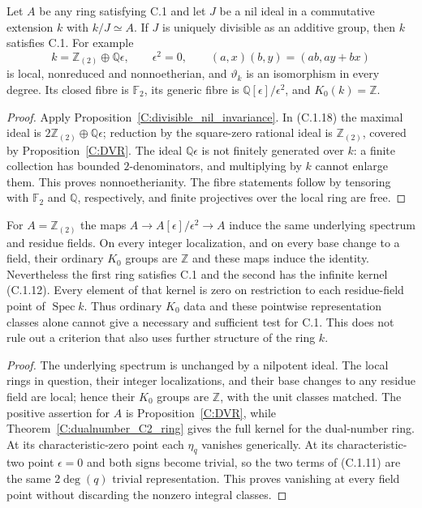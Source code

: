 \begin{corollary}
\label{C:divisible_nil_positive}
Let $A$ be any ring satisfying C.1 and let $J$ be a nil ideal in
a commutative extension $k$ with $k/J\simeq A$. If $J$ is uniquely
divisible as an additive group, then $k$ satisfies C.1.
For example
\[
 k=\mathbb Z_{(2)}\oplus\mathbb Q\epsilon,
 \qquad\epsilon^2=0,\qquad
 (a,x)(b,y)=(ab,ay+bx)                                \tag{C.1.18}
\]
is local, nonreduced and nonnoetherian, and
$\vartheta_k$ is an isomorphism in every degree. Its closed
fibre is $\mathbb F_2$, its generic fibre is
$\mathbb Q[\epsilon]/\epsilon^2$, and $K_0(k)=\mathbb Z$.
\end{corollary}
\begin{proof}
Apply Proposition~\ref{C:divisible_nil_invariance}.
In (C.1.18) the maximal ideal is
$2\mathbb Z_{(2)}\oplus\mathbb Q\epsilon$; reduction by the
square-zero rational ideal is $\mathbb Z_{(2)}$, covered by
Proposition~\ref{C:DVR}. The ideal $\mathbb Q\epsilon$ is not
finitely generated over $k$: a finite collection has bounded
$2$-denominators, and multiplying by $k$ cannot enlarge them.
This proves nonnoetherianity. The fibre statements follow by
tensoring with $\mathbb F_2$ and $\mathbb Q$, respectively, and
finite projectives over the local ring are free.
\end{proof}

\begin{corollary}
\label{C:fibre_invisible_kernel}
For $A=\mathbb Z_{(2)}$ the maps
$A\to A[\epsilon]/\epsilon^2\to A$ induce the same underlying
spectrum and residue fields. On every integer localization, and
on every base change to a field, their ordinary $K_0$ groups are $\mathbb Z$
and these maps induce the identity. Nevertheless the first ring
satisfies C.1 and the second has the infinite kernel (C.1.12).
Every element of that kernel is zero on restriction to each
residue-field point of $\operatorname{Spec}k$. Thus ordinary
$K_0$ data and these pointwise representation classes alone cannot
give a necessary and sufficient test for C.1. This does not rule
out a criterion that also uses further structure of the ring $k$.
\end{corollary}
\begin{proof}
The underlying spectrum is unchanged by a nilpotent ideal.
The local rings in question, their integer localizations, and
their base changes to any residue field are local; hence their
$K_0$ groups are $\mathbb Z$, with the unit classes matched.
The positive assertion for $A$ is Proposition~\ref{C:DVR}, while
Theorem~\ref{C:dualnumber_C2_ring} gives the full kernel for the
dual-number ring. At its characteristic-zero point each $\eta_q$
vanishes generically. At its characteristic-two point
$\epsilon=0$ and both signs become trivial, so the two terms
of (C.1.11) are the same $2\deg(q)$ trivial representation.
This proves vanishing at every field point without discarding
the nonzero integral classes.
\end{proof}

